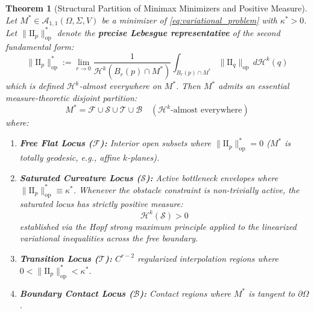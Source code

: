 \documentclass[11pt,reqno]{amsart}
\newtheorem{theorem}{Theorem}[section]
\theoremstyle{definition}
\providecommand{\II}{\mathrm{I\!I}}
\newcommand{\op}{\mathrm{op}}
\providecommand{\Hsn}{\mathcal{H}}
\numberwithin{equation}{section}
\providecommand{\II}{\mathrm{II}}
\providecommand{\Hsn}{\mathcal{H}}
\begin{document}
\begin{theorem}[Structural Partition of Minimax Minimizers and Positive Measure]
\label{thm:structural_decomp}
Let $M^* \in \mathcal{A}_{1,1}(\Omega, \Sigma, V)$ be a minimizer of \eqref{eq:variational_problem} with $\kappa^* > 0$. Let $\|\II_p\|_{\op}^*$ denote the \textbf{precise Lebesgue representative} of the second fundamental form:
\begin{equation}
\|\II_p\|_{\op}^* := \lim_{r \to 0} \frac{1}{\Hsn^k(B_r(p) \cap M^*)} \int_{B_r(p) \cap M^*} \|\II_q\|_{\op} \, d\Hsn^k(q)
\end{equation}
which is defined $\Hsn^k$-almost everywhere on $M^*$.
Then $M^*$ admits an essential measure-theoretic disjoint partition:
\begin{equation}
M^* = \mathcal{F} \cup \mathcal{S} \cup \mathcal{T} \cup \mathcal{B} \quad (\Hsn^k\text{-almost everywhere})
\end{equation}
where:
\begin{enumerate}
    \item \textbf{Free Flat Locus ($\mathcal{F}$):} Interior open subsets where $\|\II_p\|_{\op}^* = 0$ ($M^*$ is totally geodesic, e.g., affine $k$-planes).
    \item \textbf{Saturated Curvature Locus ($\mathcal{S}$):} Active bottleneck envelopes where $\|\II_p\|_{\op}^* \equiv \kappa^*$. Whenever the obstacle constraint is non-trivially active, the saturated locus has strictly positive measure:
    \begin{equation}
    \Hsn^k(\mathcal{S}) > 0
    \end{equation}
    established via the Hopf strong maximum principle applied to the linearized variational inequalities across the free boundary.
    \item \textbf{Transition Locus ($\mathcal{T}$):} $C^{r-2}$ regularized interpolation regions where $0 < \|\II_p\|_{\op}^* < \kappa^*$.
    \item \textbf{Boundary Contact Locus ($\mathcal{B}$):} Contact regions where $M^*$ is tangent to $\partial\Omega$.
\end{enumerate}
\end{theorem}
\end{document}
